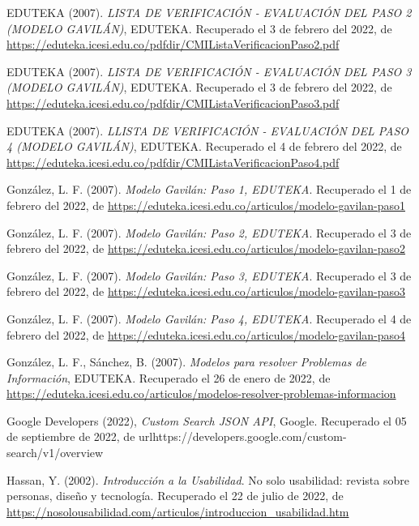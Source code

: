 \begin{thebibliography}{9}
EDUTEKA (2007). \emph{LISTA DE VERIFICACIÓN - EVALUACIÓN DEL PASO 2 (MODELO GAVILÁN)}, EDUTEKA. Recuperado el 3 de febrero del 2022, de \url{https://eduteka.icesi.edu.co/pdfdir/CMIListaVerificacionPaso2.pdf}

EDUTEKA (2007). \emph{LISTA DE VERIFICACIÓN - EVALUACIÓN DEL PASO 3 (MODELO GAVILÁN)}, EDUTEKA. Recuperado el 3 de febrero del 2022, de \url{https://eduteka.icesi.edu.co/pdfdir/CMIListaVerificacionPaso3.pdf}

EDUTEKA (2007). \emph{LLISTA DE VERIFICACIÓN - EVALUACIÓN DEL PASO 4 (MODELO GAVILÁN)}, EDUTEKA. Recuperado el 4 de febrero del 2022, de \url{https://eduteka.icesi.edu.co/pdfdir/CMIListaVerificacionPaso4.pdf}

González, L. F. (2007). \emph{Modelo Gavilán: Paso 1, EDUTEKA}. Recuperado el 1 de febrero del 2022, de \url{https://eduteka.icesi.edu.co/articulos/modelo-gavilan-paso1}

González, L. F. (2007). \emph{Modelo Gavilán: Paso 2, EDUTEKA}. Recuperado el 3 de febrero del 2022, de \url{https://eduteka.icesi.edu.co/articulos/modelo-gavilan-paso2}

González, L. F. (2007). \emph{Modelo Gavilán: Paso 3, EDUTEKA}. Recuperado el 3 de febrero del 2022, de \url{https://eduteka.icesi.edu.co/articulos/modelo-gavilan-paso3}

González, L. F. (2007). \emph{Modelo Gavilán: Paso 4, EDUTEKA}. Recuperado el 4 de febrero del 2022, de \url{https://eduteka.icesi.edu.co/articulos/modelo-gavilan-paso4}

González, L. F., Sánchez, B. (2007). \emph{Modelos para resolver Problemas de Información}, EDUTEKA. Recuperado el 26 de enero de 2022, de \url{https://eduteka.icesi.edu.co/articulos/modelos-resolver-problemas-informacion}

Google Developers (2022), \emph{Custom Search JSON API}, Google. Recuperado el 05 de septiembre de 2022, de url{https://developers.google.com/custom-search/v1/overview}

Hassan, Y. (2002). \emph{Introducción a la Usabilidad}. No solo usabilidad: revista sobre personas, diseño y tecnología. Recuperado el 22 de julio de 2022, de \url{https://nosolousabilidad.com/articulos/introduccion_usabilidad.htm}


\end{thebibliography}
